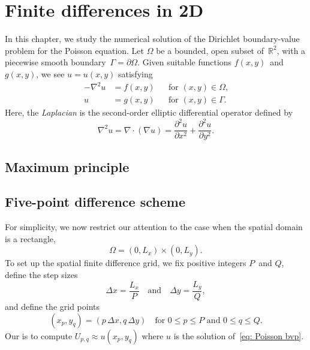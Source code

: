 \chapter{Finite differences in 2D}\label{chap: finite diff 2d}

In this chapter, we study the numerical solution of the Dirichlet boundary-value 
problem for the Poisson equation. Let $\Omega$ be a bounded, open subset 
of~$\mathbb{R}^2$, with a piecewise smooth boundary~$\Gamma=\partial\Omega$.  
Given suitable functions $f(x,y)$~and $g(x,y)$, we see $u=u(x,y)$ satisfying
\begin{equation}\label{eq: Poisson bvp}
\begin{aligned}
-\nabla^2u&=f(x,y)&&\text{for $(x,y)\in\Omega$,}\\
u&=g(x,y)&&\text{for $(x,y)\in\Gamma$.}
\end{aligned}
\end{equation}
Here, the \emph{Laplacian} is the second-order elliptic differential operator
defined by
\[
\nabla^2 u=\nabla\cdot(\nabla u)=\frac{\partial^2u}{\partial x^2}
    +\frac{\partial^2u}{\partial y^2}.
\]

\section{Maximum principle}

\section{Five-point difference scheme}
For simplicity, we now restrict our attention to the case when the spatial 
domain is a rectangle,
\[
\Omega=(0,L_x)\times(0,L_y).
\]
To set up the spatial finite difference grid, we fix positive integers $P$~and 
$Q$, define the step sizes
\[
\Delta x=\frac{L_x}{P}\quad\text{and}\quad\Delta y=\frac{L_y}{Q},
\]
and define the grid points
\[
(x_p,y_q)=(p\,\Delta x,q\,\Delta y)
\quad\text{for $0\le p\le P$ and $0\le q\le Q$.}
\]
Our is to compute $U_{p,q}\approx u(x_p,y_q)$ where $u$ is the solution 
of~\eqref{eq: Poisson bvp}.


